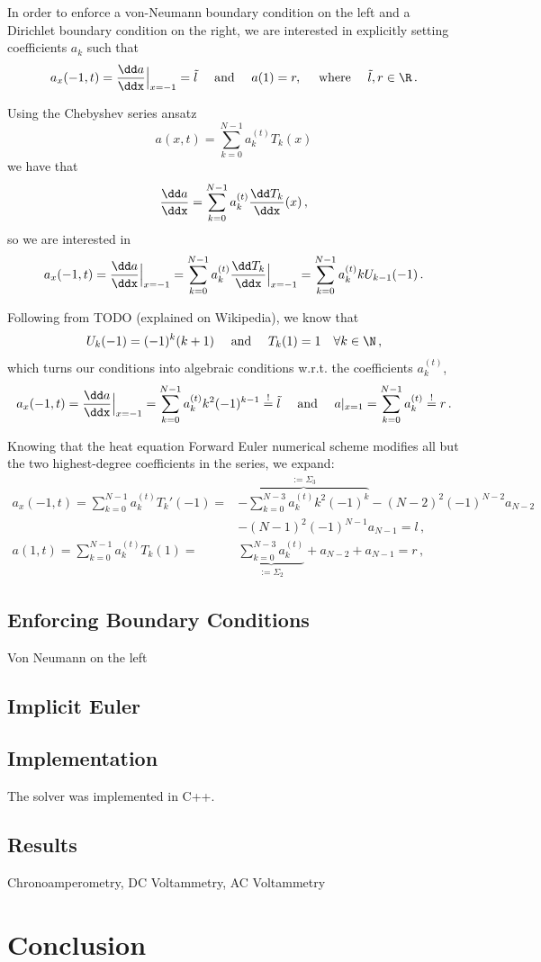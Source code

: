 \documentclass{prettytex/ox/mmsc-special-topic}
\begin{document}
  In order to enforce a von-Neumann boundary condition on the left and a Dirichlet boundary condition on the right,
  we are interested in explicitly setting coefficients $a_k$ such that
  $$a_x(-1, t) = \frac{\dd a}{\ddx}\Big|_{x=-1} = \tilde{l} \quad \text{ and } \quad a(1) = r, \quad \text{ where } \quad \tilde{l}, r \in \R\,.$$

  Using the Chebyshev series ansatz
  $$a(x, t) = \sum_{k=0}^{N-1} a_k^{(t)} T_k(x)$$
  we have that
  $$\frac{\dd a}{\ddx} = \sum_{k=0}^{N-1} a_k^{(t)} \frac{\dd T_k}{\ddx}(x)\,,$$
  so we are interested in
  $$a_x(-1, t) = \frac{\dd a}{\ddx}\Big|_{x=-1} = \sum_{k=0}^{N-1} a_k^{(t)} \frac{\dd T_k}{\ddx}\Big|_{x=-1} = \sum_{k=0}^{N-1} a_k^{(t)} k U_{k-1}(-1)\,.$$

  Following from TODO (explained on Wikipedia), we know that
  $$U_k(-1) = (-1)^k (k+1) \quad \text{ and } \quad T_k(1) = 1 \quad \forall k \in \N\,,$$
  which turns our conditions into algebraic conditions w.r.t. the coefficients $a_k^{(t)}$,
  $$a_x(-1, t) = \frac{\dd a}{\ddx}\Big|_{x=-1} = \sum_{k=0}^{N-1} a_k^{(t)} k^2 (-1)^{k-1} \overset{!}{=} \tilde{l} \quad \text{ and } \quad a|_{x=1} = \sum_{k=0}^{N-1} a_k^{(t)} \overset{!}{=} r\,.$$

  Knowing that the heat equation Forward Euler numerical scheme modifies all but the two highest-degree coefficients in the series, we expand:
  \begin{align*}
    a_x(-1, t) = \sum_{k=0}^{N-1} a_k^{(t)} T_k'(-1) =   & \overbrace{-\sum_{k=0}^{N-3} a_k^{(t)} k^2 (-1)^{k}}^{:= \Sigma_3} - (N-2)^2 (-1)^{N-2} a_{N-2}                  \\
                                                         & -(N-1)^2 (-1)^{N-1} a_{N-1} = l\,,                                                                               \\
    a(1, t)    = \sum_{k=0}^{N-1} a_k^{(t)} T_k(1)     = & \underbrace{\sum_{k=0}^{N-3} a_k^{(t)}}_{:= \Sigma_2}              + a_{N-2}                    + a_{N-1} = r\,,
  \end{align*}

  \subsection{Enforcing Boundary Conditions}
  Von Neumann on the left

  \subsection{Implicit Euler}

  \subsection{Implementation}
  The solver was implemented in C++.


  \subsection{Results}
  Chronoamperometry,
  DC Voltammetry,
  AC Voltammetry

  \section{Conclusion}

  \pagebreak
  \printbibliography
  \printnoidxglossary[type=acronym]
\end{document}
